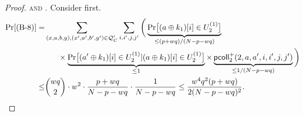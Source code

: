 \begin{proof}





%
%
%
%
%







%
%





\noindent\textsc{\beight and \bnine}. Consider \beight first.
%
\begin{align*}
\Pr[\text{(B-8)}] 
=   &  \sum_{(x,a,b,y),(x',a',b',y')\in\mathcal{Q}_{C}'}\sum_{i,i',j,j'}\bigg(\underbrace{{\Pr}\big[(a\oplus k_1)[i]\in U_2^{(1)}\big]}_{\leq(p+wq)/(N-p-wq)}     \\
& \ \ \ \ \ \times
\underbrace{{\Pr}\big[(a'\oplus k_1)[i]\in U_2^{(1)}|(a\oplus k_1)[i]\in U_2^{(1)}\big]}_{\leq1}\times\underbrace{\mathsf{pcoll}_{2}^+(2,a,a',i,i',j,j')}_{\leq1/(N-p-wq)}   \bigg)      \\
\leq  &  {wq\choose 2}\cdot w^2\cdot\frac{p+wq}{N-p-wq}\cdot\frac{1}{N-p-wq}\leq
\frac{w^4q^2(p+wq)}{2(N-p-wq)^2}.
\end{align*}
%


\end{proof}
